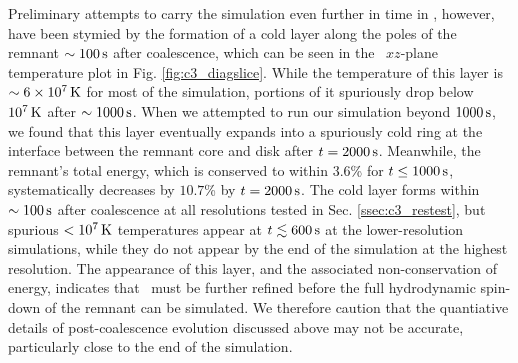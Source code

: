 
{\charles Preliminary attempts to carry the simulation even further in time in \arepo, however, have been stymied by the formation of a cold layer along the poles of the remnant $\sim100\,\mathrm{s}$ after coalescence, which can be seen in the \arepo\ $xz$-plane temperature plot in Fig. \ref{fig:c3_diagslice}.  While the temperature of this layer is $\sim6\times10^7\,\mathrm{K}$ for most of the simulation, portions of it spuriously drop below $10^7\,\mathrm{K}$ after $\sim1000\,\mathrm{s}$.  When we attempted to run our simulation beyond $1000\,\mathrm{s}$, we found that this layer eventually expands into a spuriously cold ring at the interface between the remnant core and disk after $t = 2000\,\mathrm{s}$.  Meanwhile, the remnant's total energy, which is conserved to within $3.6$\% for $t \leq 1000\,\mathrm{s}$, systematically decreases by $10.7$\% by $t = 2000\,\mathrm{s}$.  The cold layer forms within $\sim100\,\mathrm{s}$ after coalescence at all resolutions tested in Sec. \ref{ssec:c3_restest}, but spurious $<10^7\,\mathrm{K}$ temperatures appear at $t \lesssim600\,\mathrm{s}$ at the lower-resolution simulations, while they do not appear by the end of the simulation at the highest resolution.  The appearance of this layer, and the associated non-conservation of energy, indicates that \arepo\ must be further refined before the full hydrodynamic spin-down of the remnant can be simulated.  We therefore caution that the quantiative details of post-coalescence evolution discussed above may not be accurate, particularly close to the end of the simulation.}




